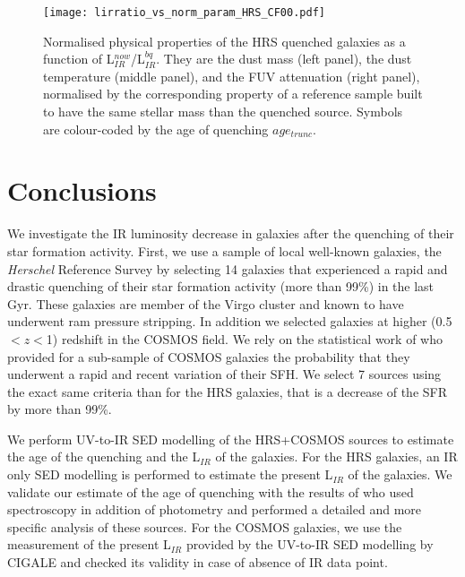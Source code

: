 \documentclass[traditabstract]{aa} %
\begin{document}
\begin{figure*}[!h] 
  	\texttt{[image: lirratio\_vs\_norm\_param\_HRS\_CF00.pdf]}
  	\caption{\label{normparam} Normalised physical properties of the HRS quenched galaxies as a function of L$_{IR}^{now}$/L$_{IR}^{bq}$. They are the dust mass (left panel), the dust temperature (middle panel), and the FUV attenuation (right panel), normalised by the corresponding property of a reference sample built to have the same stellar mass than the quenched source. Symbols are colour-coded by the age of quenching $age_{trunc}$. }
\end{figure*}


\section{\label{conclusions}Conclusions}
We investigate the IR luminosity decrease in galaxies after the quenching of their star formation activity.
First, we use a sample of local well-known galaxies, the \textit{Herschel} Reference Survey by selecting 14 galaxies that experienced a rapid and drastic quenching of their star formation activity (more than 99\%) in the last Gyr.
These galaxies are member of the Virgo cluster and known to have underwent ram pressure stripping.
In addition we selected galaxies at higher (0.5$<z<$1) redshift in the COSMOS field.
We rely on the statistical work of \cite{Aufort20} who provided for a sub-sample of COSMOS galaxies the probability that they underwent a rapid and recent variation of their SFH.
We select 7 sources using the exact same criteria than for the HRS galaxies, that is a decrease of the SFR by more than 99\%.

We perform UV-to-IR SED modelling of the HRS+COSMOS sources to estimate the age of the quenching and the L$_{IR}$ of the galaxies.
For the HRS galaxies, an IR only SED modelling is performed to estimate the present L$_{IR}$ of the galaxies.
We validate our estimate of the age of quenching with the results of \cite{Boselli16} who used spectroscopy in addition of photometry and performed a detailed and more specific analysis of these sources.
For the COSMOS galaxies, we use the measurement of the present L$_{IR}$ provided by the UV-to-IR SED modelling by CIGALE and checked its validity in case of absence of IR data point.
\end{document}
